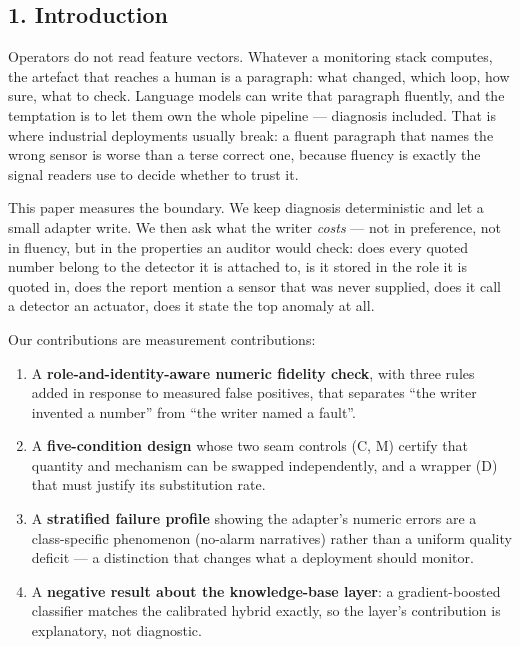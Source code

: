 \documentclass[
  10pt,
]{article}
\providecommand{\tightlist}{%
  \setlength{\itemsep}{0pt}\setlength{\parskip}{0pt}}
\begin{document}
\subsection{1. Introduction}\label{introduction}

Operators do not read feature vectors. Whatever a monitoring stack
computes, the artefact that reaches a human is a paragraph: what
changed, which loop, how sure, what to check. Language models can write
that paragraph fluently, and the temptation is to let them own the whole
pipeline --- diagnosis included. That is where industrial deployments
usually break: a fluent paragraph that names the wrong sensor is worse
than a terse correct one, because fluency is exactly the signal readers
use to decide whether to trust it.

This paper measures the boundary. We keep diagnosis deterministic and
let a small adapter write. We then ask what the writer \emph{costs} ---
not in preference, not in fluency, but in the properties an auditor
would check: does every quoted number belong to the detector it is
attached to, is it stored in the role it is quoted in, does the report
mention a sensor that was never supplied, does it call a detector an
actuator, does it state the top anomaly at all.

Our contributions are measurement contributions:

\begin{enumerate}
\def\labelenumi{\arabic{enumi}.}
\tightlist
\item
  A \textbf{role-and-identity-aware numeric fidelity check}, with three
  rules added in response to measured false positives, that separates
  ``the writer invented a number'' from ``the writer named a fault''.
\item
  A \textbf{five-condition design} whose two seam controls (C, M)
  certify that quantity and mechanism can be swapped independently, and
  a wrapper (D) that must justify its substitution rate.
\item
  A \textbf{stratified failure profile} showing the adapter's numeric
  errors are a class-specific phenomenon (no-alarm narratives) rather
  than a uniform quality deficit --- a distinction that changes what a
  deployment should monitor.
\item
  A \textbf{negative result about the knowledge-base layer}: a
  gradient-boosted classifier matches the calibrated hybrid exactly, so
  the layer's contribution is explanatory, not diagnostic.
\end{enumerate}
\end{document}
